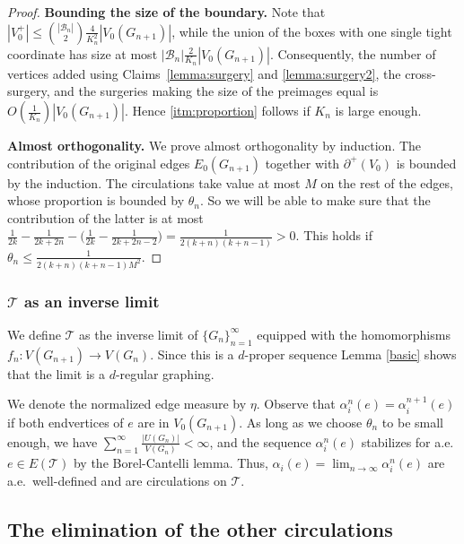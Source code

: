 \documentclass[10pt]{article}
\theoremstyle{plain}
\theoremstyle{remark}
\newcommand{\1}{\mathbbm{1}}
\newcommand{\mcT}{\mathcal{T}}
\numberwithin{equation}{section}
\begin{document}
\begin{proof}
{\bf Bounding the size of the boundary.} Note that $|V_0^+| \leq {|\mathcal{B}_n| \choose 2} \frac{4}{K_n^2}|V_0(G_{n+1})|$, while the union of the boxes with one single tight coordinate has size at most 
$|\mathcal{B}_n| \frac{2}{K_n}|V_0(G_{n+1})|$.
Consequently, the number of vertices added using Claims~\ref{lemma:surgery} and \ref{lemma:surgery2}, the cross-surgery, and the surgeries making the size of the preimages equal  is  $O(\frac{1}{K_n})|V_0(G_{n+1})|$. Hence \ref{itm:proportion} follows if $K_n$ is large enough.

{\bf Almost orthogonality.} We prove almost orthogonality by induction. The contribution of the original edges $E_0(G_{n+1})$ together with $\partial^+(V_0)$ is bounded by the induction. The circulations take value at most $M$ on the rest of the edges, whose proportion is bounded by $\theta_n$. So we will be able to make sure that the contribution of the latter is at most $\frac{1}{2k}-\frac{1}{2k+2n} - \big(\frac{1}{2k}-\frac{1}{2k+2n-2}\big)=\frac{1}{2(k+n)(k+n-1)}>0$. This holds if $\theta_n \leq \frac{1}{2(k+n)(k+n-1)M^2}$. 
\end{proof} 





\subsubsection{$\mcT$ as an inverse limit}

We define $\mcT$ as the inverse limit of $\{ G_n \}_{n=1}^{\infty}$ equipped with the homomorphisms $f_n:V(G_{n+1}) \rightarrow V(G_n)$. Since this is a $d$-proper sequence
Lemma \ref{basic} shows that the limit is a $d$-regular graphing.

We denote the normalized edge measure by $\eta$. Observe that $\alpha^n_i(e)=\alpha^{n+1}_i(e)$ if both endvertices of $e$ are in $V_0(G_{n+1})$. As long as we choose $\theta_n$ to be small enough, we have $\sum_{n=1}^{\infty} \frac{|U(G_n)|}{V(G_n)}<\infty$, and the sequence $\alpha^n_i(e)$ stabilizes for a.e. $e \in E(\mcT)$ by the Borel-Cantelli lemma. Thus, $\alpha_i(e)=\lim_{n\to \infty}\alpha_i^{n}(e)$ are a.e.\ well-defined and are circulations on $\mathcal{T}$. 

\subsection{The elimination of the other circulations} \label{subsec:no_other_circ}
\end{document}
